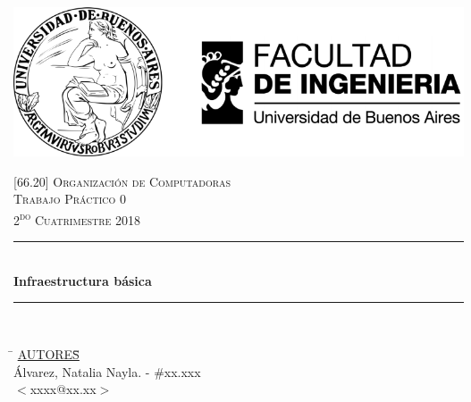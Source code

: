 

\pagestyle{fancy}
\begin{titlepage}
	\newcommand{\HRule}{\rule{\linewidth}{0.5mm}} %
	\center %
	
	\thispagestyle{empty}
	\begin{center}
		\includegraphics[scale=1]{includes/banner_fiuba.pdf}\\
	\end{center}
	
	
	\textsc{\LARGE \textsc{[66.20] Organización de Computadoras}}\\[1cm]
	\textsc{\Large \textsc{Trabajo Práctico 0}}\\[0.5cm]
	\textsc{\large 2\textsuperscript{do} Cuatrimestre 2018}\\[0.5cm]
	
	\HRule\\[0.5cm]
	{\huge\bfseries Infraestructura básica}\\[0.2cm]
	\HRule\\[0.5cm]
	
	\begin{tabbing}
		\hspace{2cm}\=\+
		\underline{AUTORES}\hspace{-1cm}\=\+\hspace{1cm}\=\hspace{6cm}\=\\[0.2cm]
		
		Álvarez, Natalia Nayla.	\>\>- \#xx.xxx\\
		\>\footnotesize{$<$xxxx@xx.xx$>$}\\
		

\end{tabbing}
\end{titlepage}
